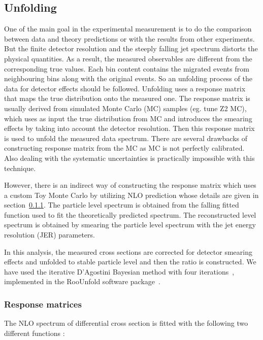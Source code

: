 \subsection{Unfolding}
\label{sec:unfolding}
One of the main goal in the experimental measurement is to do the comparison between data and theory predictions or with the results from 
other experiments. But the finite detector resolution and the steeply falling jet \pt spectrum distorts the physical quantities. As a 
result, the measured observables are different from the corresponding true values. Each \pt bin content contains the migrated events from 
neighbouring bins along with the original events. So an unfolding process of the data for detector effects should be followed. Unfolding 
uses a response matrix that maps the true distribution onto the measured one. The response matrix is usually derived from simulated Monte 
Carlo (MC) samples (eg. \PYTHIAS tune Z2 MC), which uses as input the true distribution from MC and introduces the smearing effects by 
taking into account the detector resolution. Then this response matrix is used to unfold the measured data spectrum. There are several 
drawbacks of constructing response matrix from the MC as MC is not perfectly calibrated. Also dealing with the systematic uncertainties is 
practically impossible with this technique.

However, there is an indirect way of constructing the response matrix which 
uses a custom Toy Monte Carlo by utilizing NLO prediction whose 
details are given in section~\ref{sec:funcs}. The particle level \httwo spectrum is 
obtained from the falling fitted function used to fit the theoretically 
predicted \httwo spectrum.  The reconstructed level \httwo spectrum is 
obtained by smearing the particle level \httwo spectrum with the jet energy 
resolution (JER) parameters.  

In this analysis, the measured cross sections are corrected for detector 
smearing effects and unfolded to stable particle level and then the ratio 
\ratio is constructed. We have used the iterative D'Agostini Bayesian method 
with four iterations~\cite{D'Agostini:1994zf}, implemented in the RooUnfold 
software package~\cite{Adye:2011gm}. 

\subsubsection{Response matrices}
\label{sec:funcs}
The NLO spectrum of differential cross section is fitted with the following two different functions :  

